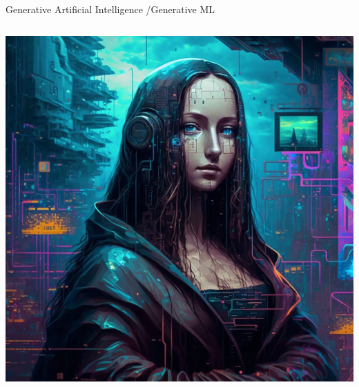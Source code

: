 \documentclass[aspectratio=169,xcolor=dvipsnames,svgnames,x11names,fleqn]{beamer}
\begin{document}
\begin{frame}{Generative Artificial Intelligence /Generative ML}
\begin{columns}
            \includegraphics[width=0.9\linewidth,trim=1cm 1.5cm 1cm 1.5cm,clip]{figures/Cyberpunk_Mondalisa.png}
    
\end{columns}


    
\end{frame}
\end{document}
